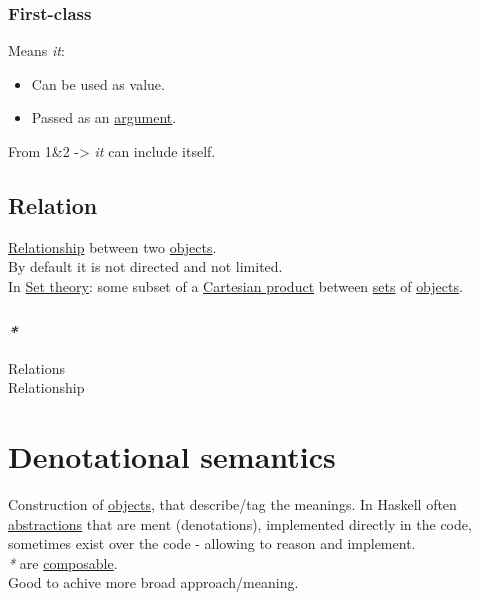 \documentclass[a4paper,14pt,oneside]{book}
\begin{document}
\subsubsection{\label{org9b22ff7}First-class}
\label{sec:org6858538}
Means \emph{it}:\\
\begin{itemize}
\item Can be used as value.\\
\item Passed as an \hyperref[org64a41d1]{argument}.\\
\end{itemize}
From 1\&2 -> \emph{it} can include itself.\\

\subsection{\label{org5333a06}Relation}
\label{sec:org295b30a}
\hyperref[org09e6a1b]{Relationship} between two \hyperref[org7a81896]{objects}.\\
By default it is not directed and not limited.\\
In \hyperref[orgd5e0085]{Set theory}: some subset of a \hyperref[org993bebc]{Cartesian product} between \hyperref[orgeb8f42e]{sets} of \hyperref[org7a81896]{objects}.\\

\subsubsection{\emph{*}}
\label{sec:orgd609ffe}

\label{org7fffedb}Relations\\
\label{org09e6a1b}Relationship\\

\section{\label{org0b4d230}Denotational semantics}
\label{sec:org5287c49}
Construction of \hyperref[org7a81896]{objects}, that describe/tag the meanings. In Haskell often \hyperref[org8f72626]{abstractions} that are ment (denotations), implemented directly in the code, sometimes exist over the code - allowing to reason and implement.\\

\emph{*} are \hyperref[orgce469e7]{composable}.\\

Good to achive more broad approach/meaning.\\
\end{document}
